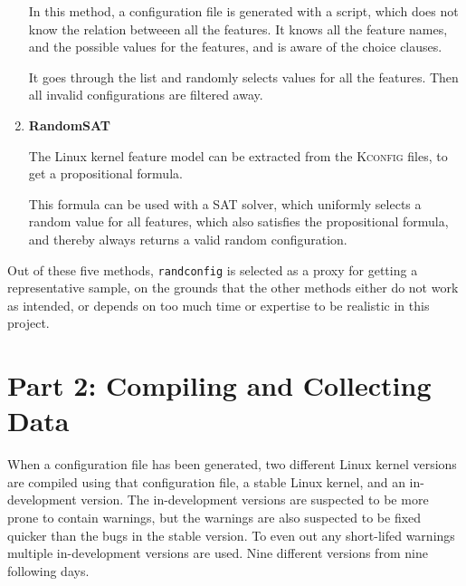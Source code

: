 \documentclass[a4paper,11pt]{report}
\begin{document}
\begin{enumerate}
In this method, a configuration file is generated with a script, which 
does not know the relation betweeen all the features. It knows all the feature
names, and the possible values for the features, and is aware of the choice 
clauses.

It goes through the list and randomly selects values for all the features. Then 
all invalid configurations are filtered away.


    \item \textbf{RandomSAT}

The Linux kernel feature model can be extracted from the \textsc{Kconfig} 
files, to get a propositional formula\cite{lvat}. 

This formula can be used with a SAT solver, which uniformly selects a random
value for all features, which also satisfies the propositional formula, and
thereby always returns a valid random configuration.


    
\end{enumerate}


Out of these five methods, \texttt{randconfig} is selected as a proxy for 
getting a representative sample, on the grounds that the other methods either
do not work as intended, or depends on too much time or expertise to be realistic 
in this project.

            \section{Part 2: Compiling and Collecting Data}

When a configuration file has been generated, two different Linux kernel 
versions are compiled using that configuration file, a stable Linux kernel, and 
an in-development version. The in-development versions are suspected to be more 
prone to contain warnings, but the warnings are also suspected to be fixed 
quicker than the bugs in the stable version. To even out any short-lifed warnings
multiple in-development versions are used. Nine different versions from nine following days.

\end{document}
